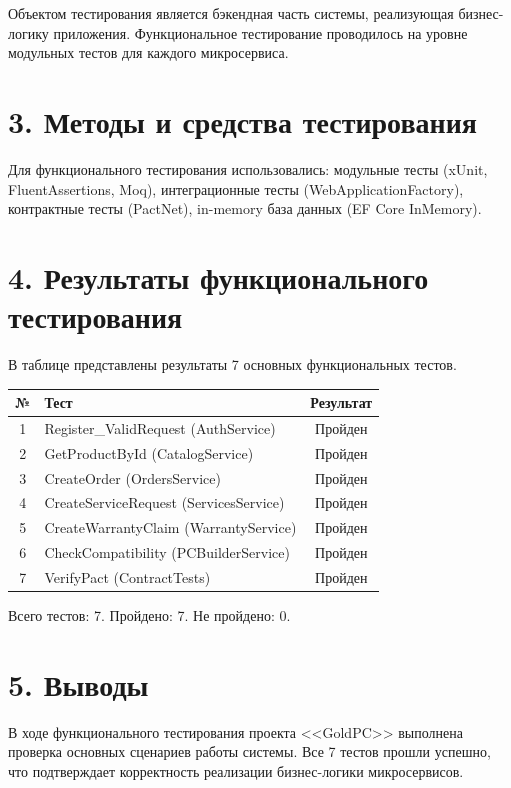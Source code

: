 \documentclass[12pt,a4paper]{article}
\begin{document}
Объектом тестирования является бэкендная часть системы, реализующая бизнес-логику приложения. Функциональное тестирование проводилось на уровне модульных тестов для каждого микросервиса.

\section{3. Методы и средства тестирования}

Для функционального тестирования использовались: модульные тесты (xUnit, FluentAssertions, Moq), интеграционные тесты (WebApplicationFactory), контрактные тесты (PactNet), in-memory база данных (EF Core InMemory).

\section{4. Результаты функционального тестирования}

В таблице представлены результаты 7 основных функциональных тестов.

\begin{center}
\begin{tabularx}{\textwidth}{|c|X|c|}
\hline
№ & Тест & Результат \\
\hline
1 & Register\_ValidRequest (AuthService) & Пройден \\
\hline
2 & GetProductById (CatalogService) & Пройден \\
\hline
3 & CreateOrder (OrdersService) & Пройден \\
\hline
4 & CreateServiceRequest (ServicesService) & Пройден \\
\hline
5 & CreateWarrantyClaim (WarrantyService) & Пройден \\
\hline
6 & CheckCompatibility (PCBuilderService) & Пройден \\
\hline
7 & VerifyPact (ContractTests) & Пройден \\
\hline
\end{tabularx}
\end{center}

Всего тестов: 7. Пройдено: 7. Не пройдено: 0.

\section{5. Выводы}

В ходе функционального тестирования проекта <<GoldPC>> выполнена проверка основных сценариев работы системы. Все 7 тестов прошли успешно, что подтверждает корректность реализации бизнес-логики микросервисов.
\end{document}
